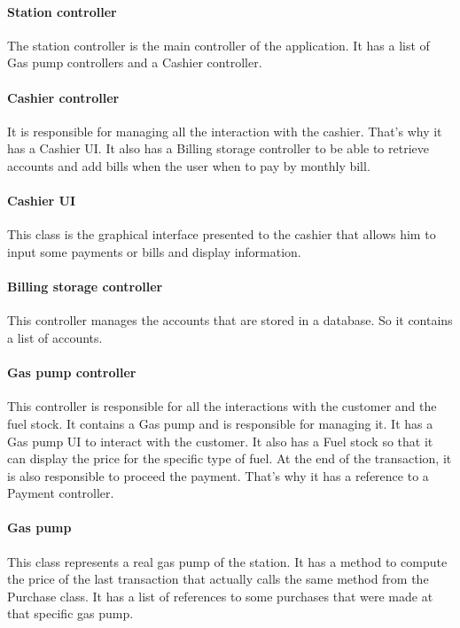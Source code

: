 \paragraph{Station controller}
The station controller is the main controller of the application. It has a list of Gas pump controllers and a Cashier controller. 

\paragraph{Cashier controller}
It is responsible for managing all the interaction with the cashier. That's why it has a Cashier UI. It also has a Billing storage controller to be able to retrieve accounts and add bills when the user when to pay by monthly bill.

\paragraph{Cashier UI}
This class is the graphical interface presented to the cashier that allows him to input some payments or bills and display information.

\paragraph{Billing storage controller}
This controller manages the accounts that are stored in a database. So it contains a list of accounts.

\paragraph{Gas pump controller}
This controller is responsible for all the interactions with the customer and the fuel stock.
It contains a Gas pump and is responsible for managing it. It has a Gas pump UI to interact with the customer. It also has a Fuel stock so that it can display the price for the specific type of fuel.
At the end of the transaction, it is also responsible to proceed the payment. That's why it has a reference to a Payment controller.

\paragraph{Gas pump}
This class represents a real gas pump of the station. It has a method to compute the price of the last transaction that actually calls the same method from the Purchase class.
It has a list of references to some purchases that were made at that specific gas pump.

